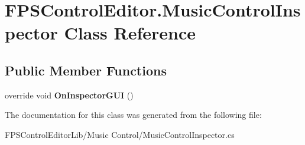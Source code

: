 \hypertarget{class_f_p_s_control_editor_1_1_music_control_inspector}{\section{F\-P\-S\-Control\-Editor.\-Music\-Control\-Inspector Class Reference}
\label{class_f_p_s_control_editor_1_1_music_control_inspector}
}
\subsection*{Public Member Functions}
\begin{DoxyCompactItemize}
\item 
\hypertarget{class_f_p_s_control_editor_1_1_music_control_inspector_afe49398facaf66065fd4446e142c9dbb}{override void {\bfseries On\-Inspector\-G\-U\-I} ()}\label{class_f_p_s_control_editor_1_1_music_control_inspector_afe49398facaf66065fd4446e142c9dbb}

\end{DoxyCompactItemize}


The documentation for this class was generated from the following file\-:\begin{DoxyCompactItemize}
\item 
F\-P\-S\-Control\-Editor\-Lib/\-Music Control/Music\-Control\-Inspector.\-cs\end{DoxyCompactItemize}
